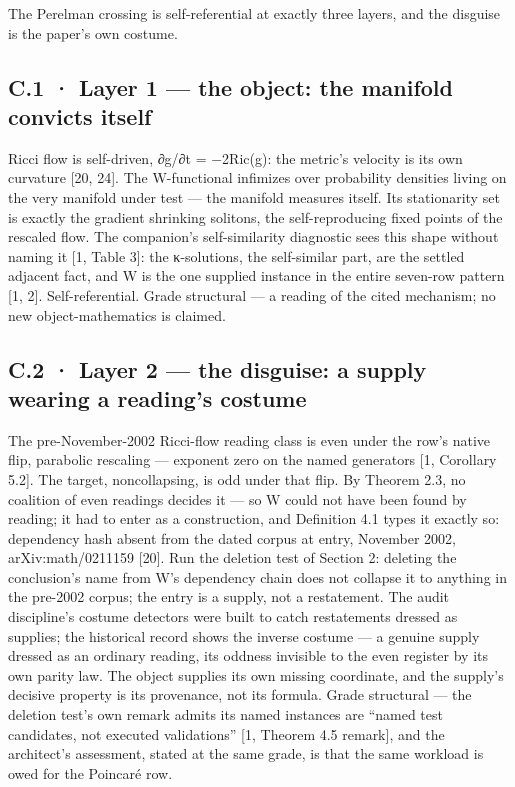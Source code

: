 \documentclass[10pt,twocolumn]{article}
\begin{document}
The Perelman crossing is self-referential at exactly three layers, and
the disguise is the paper's own costume.

\subsection{C.1 · Layer 1 --- the object: the manifold convicts
itself}\label{c.1-layer-1-the-object-the-manifold-convicts-itself}

Ricci flow is self-driven, ∂g/∂t = −2Ric(g): the metric's velocity is
its own curvature {[}20, 24{]}. The W-functional infimizes over
probability densities living on the very manifold under test --- the
manifold measures itself. Its stationarity set is exactly the gradient
shrinking solitons, the self-reproducing fixed points of the rescaled
flow. The companion's self-similarity diagnostic sees this shape without
naming it {[}1, Table 3{]}: the κ-solutions, the self-similar part, are
the settled adjacent fact, and W is the one supplied instance in the
entire seven-row pattern {[}1, 2{]}. Self-referential. Grade structural
--- a reading of the cited mechanism; no new object-mathematics is
claimed.

\subsection{C.2 · Layer 2 --- the disguise: a supply wearing a reading's
costume}\label{c.2-layer-2-the-disguise-a-supply-wearing-a-readings-costume}

The pre-November-2002 Ricci-flow reading class is even under the row's
native flip, parabolic rescaling --- exponent zero on the named
generators {[}1, Corollary 5.2{]}. The target, noncollapsing, is odd
under that flip. By Theorem 2.3, no coalition of even readings decides
it --- so W could not have been found by reading; it had to enter as a
construction, and Definition 4.1 types it exactly so: dependency hash
absent from the dated corpus at entry, November 2002, arXiv:math/0211159
{[}20{]}. Run the deletion test of Section 2: deleting the conclusion's
name from W's dependency chain does not collapse it to anything in the
pre-2002 corpus; the entry is a supply, not a restatement. The audit
discipline's costume detectors were built to catch restatements dressed
as supplies; the historical record shows the inverse costume --- a
genuine supply dressed as an ordinary reading, its oddness invisible to
the even register by its own parity law. The object supplies its own
missing coordinate, and the supply's decisive property is its
provenance, not its formula. Grade structural --- the deletion test's
own remark admits its named instances are ``named test candidates, not
executed validations'' {[}1, Theorem 4.5 remark{]}, and the architect's
assessment, stated at the same grade, is that the same workload is owed
for the Poincaré row.
\end{document}
